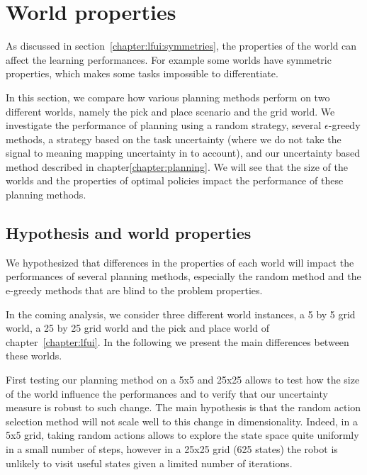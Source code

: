 
\section{World properties}
\label{chapter:limitations:wordlproperties}


As discussed in section~\ref{chapter:lfui:symmetries}, the properties of the world can affect the learning performances. For example some worlds have symmetric properties, which makes some tasks impossible to differentiate.

In this section, we compare how various planning methods perform on two different worlds, namely the pick and place scenario and the grid world. We investigate the performance of planning using a random strategy, several $\epsilon$-greedy methods, a strategy based on the task uncertainty (where we do not take the signal to meaning mapping uncertainty in to account), and our uncertainty based method described in chapter\ref{chapter:planning}. We will see that the size of the worlds and the properties of optimal policies impact the performance of these planning methods.

\subsection{Hypothesis and world properties}

We hypothesized that differences in the properties of each world will impact the performances of several planning methods, especially the random method and the e-greedy methods that are blind to the problem properties.

In the coming analysis, we consider three different world instances, a 5 by 5 grid world, a 25 by 25 grid world and the pick and place world of chapter~\ref{chapter:lfui}. In the following we present the main differences between these worlds.

First testing our planning method on a 5x5 and 25x25 allows to test how the size of the world influence the performances and to verify that our uncertainty measure is robust to such change. The main hypothesis is that the random action selection method will not scale well to this change in dimensionality. Indeed, in a 5x5 grid, taking random actions allows to explore the state space quite uniformly in a small number of steps, however in a 25x25 grid (625 states) the robot is unlikely to visit useful states given a limited number of iterations.

